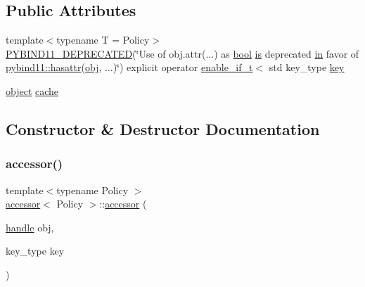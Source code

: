 \subsection*{Public Attributes}
\begin{DoxyCompactItemize}
\item 
{\footnotesize template$<$typename T  = Policy$>$ }\\\mbox{\hyperlink{classobject__api_a805215f1a7d50f7fb6a6ffb723707c73}{P\+Y\+B\+I\+N\+D11\+\_\+\+D\+E\+P\+R\+E\+C\+A\+T\+ED}}(\char`\"{}Use of obj.\+attr(...) as \mbox{\hyperlink{asdl_8h_af6a258d8f3ee5206d682d799316314b1}{bool}} \mbox{\hyperlink{classobject__api_a63b93f9f16e8e08c9672fe553c054885}{is}} deprecated \mbox{\hyperlink{_s_d_l__opengl__glext_8h_a83ad0ee7f1e06b59c90271716e689080}{in}} favor of \mbox{\hyperlink{group__python__builtins_gaec38f84a4416ddc3b311ecdbff659ed7}{pybind11\+::hasattr}}(\mbox{\hyperlink{_s_d_l__opengl__glext_8h_a0c0d4701a6c89f4f7f0640715d27ab26}{obj}}, ...)\char`\"{}) explicit operator \mbox{\hyperlink{detail_2common_8h_a012819c9e8b5e04872a271f50f8b8196}{enable\+\_\+if\+\_\+t}}$<$ std key\+\_\+type \mbox{\hyperlink{classaccessor_ac599d310f957d08a51d4cfc03fdef059}{key}}
\item 
\mbox{\hyperlink{classobject}{object}} \mbox{\hyperlink{classaccessor_a438d2ca6be1c59c62f7323c5ba330bb3}{cache}}
\end{DoxyCompactItemize}


\subsection{Constructor \& Destructor Documentation}
\mbox{\label{classaccessor_a7545c456f71e9d6265ed0ce54a104be1}} 
\subsubsection{\texorpdfstring{accessor()}{accessor()}\hspace{0.1cm}{\footnotesize\ttfamily [1/3]}}
{\footnotesize\ttfamily template$<$typename Policy $>$ \\
\mbox{\hyperlink{classaccessor}{accessor}}$<$ Policy $>$\+::\mbox{\hyperlink{classaccessor}{accessor}} (\begin{DoxyParamCaption}\item[{\mbox{\hyperlink{classhandle}{handle}}}]{obj,  }\item[{key\+\_\+type}]{key }\end{DoxyParamCaption})\hspace{0.3cm}{\ttfamily [inline]}}

